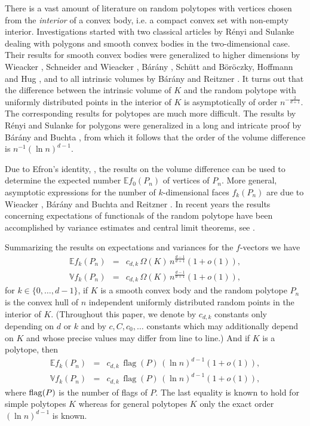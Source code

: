 \documentclass[12pt]{article}
\def\E{{\mathds E}}
\def\V{{\mathds V}}
\theoremstyle{definition}
\begin{document}
There is a vast amount of literature on random polytopes with vertices chosen from the \emph{interior} of a convex body, i.e. a compact convex set with non-empty interior. Investigations started with two classical articles by R\'enyi and Sulanke \cite{RS63, RS64} dealing with polygons and smooth convex bodies in the two-dimensional case. Their results for smooth convex bodies were generalized to higher dimensions by Wieacker \cite{Wi}, Schneider and Wieacker \cite{SchWi1}, B\'ar\'any \cite{Bar2}, Sch\"utt \cite{Schu2} and B\"or\"oczky, Hoffmann and Hug \cite{BHH}, and to all intrinsic volumes by B\'ar\'any \cite{Bar2, Bar2c} and Reitzner \cite{Re04}. It turns out that the difference between the intrinsic volume of $K$ and the random polytope with uniformly distributed points in the interior of $K$ is asymptotically of order $n^{- \frac 2 {d+1}}$.  The corresponding results for polytopes are much more difficult. The results by R\'enyi and Sulanke for polygons were generalized in a long and intricate proof by B\'ar\'any and Buchta \cite{BB93}, from which it follows that the order of the volume difference is $n^{-1} (\ln n)^{d-1} $.

Due to Efron's identity, \cite{Ef}, the results on the volume difference can be used to determine the expected number $\E f_0(P_n)$ of vertices of $P_n$. More general, asymptotic expressions for the number of $k$-dimensional faces $f_k (P_n)$ are due to Wieacker \cite{Wi}, B\'ar\'any and Buchta \cite{BB93} and Reitzner \cite{Re05}.
In recent years the results concerning expectations of functionals of the random polytope have been accomplished by variance estimates and central limit theorems, see 
\cite{BR10a, BR10, BS13, CSY13, CY14, CY17, Gro88, Gry21, GRT23, LachSchulteYukich, Pardon1, Pardon2, Re03, Re05, ThTuWe18}.

Summarizing the results on expectations and variances for the $f$-vectors we have
\begin{eqnarray*}
\E f_k  (P_n) &=& c_{d,k} \, \Omega(K) \, n^{ \frac {d-1} {d+1}}(1+o(1)),
\\
\V f_k  (P_n) &=& c_{d,k} \, \Omega(K) \, n^{ \frac {d-1} {d+1}}(1+o(1)),
\end{eqnarray*}
for $k  \in \{0, \dots, d-1\}$, if $K$ is a smooth convex body and the random polytope $P_n$ is the convex hull of $n$ independent uniformly distributed random points in the interior of $K$.
(Throughout this paper, we denote by $c_{d,k}$ constants only depending on $d$ or $k$ and by $c,C,c_0,\dots$ constants which may additionally depend on $K$ and whose precise values may differ from line to line.)
And if $K$ is a polytope, then
\begin{eqnarray*}
\E f_k  (P_n) &=&  c_{d,k}\,   \operatorname{flag}(P) \, (\ln n)^{ {d-1}} (1+o(1)) ,
\\
\V f_k  (P_n) &=&  c_{d,k}\,   \operatorname{flag}(P) \, (\ln n)^{ {d-1}} (1+o(1)) ,
\end{eqnarray*}
where ${\rm flag}(P)$ is the number of flags of $P$. The last equality is known to hold for simple polytopes $K$ whereas for general polytopes $K$ only the exact order $(\ln n)^{ {d-1}}$ is known. 
\end{document}

